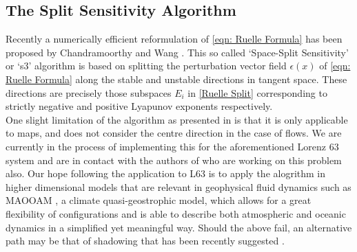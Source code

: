 \subsection{The Split Sensitivity Algorithm}

Recently a numerically efficient reformulation of \ref{eqn: Ruelle Formula} has been proposed by Chandramoorthy and Wang \cite{Chandramoorthy2020}. This so called `Space-Split Sensitivity' or `s3' algorithm is based on splitting the perturbation vector field $\epsilon(x)$ of \ref{eqn: Ruelle Formula} along the stable and unstable directions in tangent space. These directions are precisely those subspaces $E_i$ in \ref{Ruelle Split} corresponding to strictly negative and positive Lyapunov exponents respectively.\\

One slight limitation of the algorithm as presented in \cite{Chandramoorthy2020} is that it is only applicable to maps, and does not consider the centre direction in the case of flows. We are currently in the process of implementing this for the aforementioned Lorenz $63$ system and are in contact with the authors of \cite{Chandramoorthy2020} who are working on this problem also. Our hope following the application to L63 is to apply the alogrithm in higher dimensional models that are relevant in geophysical fluid dynamics such as MAOOAM \cite{DeCruz2016}, a climate quasi-geostrophic model, which allows for a great flexibility of configurations and is able to describe both atmospheric and oceanic dynamics in a simplified yet meaningful way. Should the above fail, an alternative path may be that of shadowing that has been recently suggested \cite{Ni2020} \cite{Ni2020a}.  
